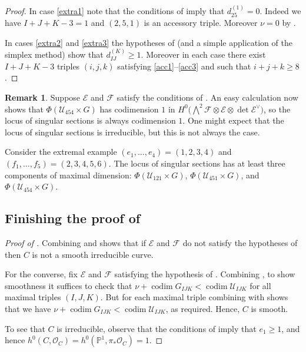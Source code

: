 \documentclass[11pt]{amsart}
\numberwithin{theorem}{section}
\numberwithin{equation}{section}
\theoremstyle{definition}\newtheorem{defn}[theorem]{Definition}
\theoremstyle{definition}\newtheorem{remark}[theorem]{Remark}
\theoremstyle{definition}\newtheorem{question}[theorem]{Question}
\theoremstyle{definition}\newtheorem{problem}[theorem]{Problem}
\newcommand{\PP}{\mathbb{P}}
\newcommand{\cE}{\mathcal{E}}
\newcommand{\cF}{\mathcal{F}}
\newcommand{\cO}{\mathcal{O}}
\DeclareMathOperator{\codim}{codim}
\newcommand{\marksing}{\mathcal{U}}
\newcommand{\I}{I}
\newcommand{\J}{J}
\newcommand{\K}{K}
\begin{document}
\begin{proof}
In case \ref{extra1} note that the conditions of  imply that $d^{(1)}_{25} = 0$. Indeed we have $\I+\J+\K-3 = 1$ and $(2,5,1)$ is an accessory triple. Moreover $\nu = 0$ by .

In cases \ref{extra2} and \ref{extra3} the hypotheses of  (and a simple application of the simplex method) show that $d^{(\K)}_{\I \J} \geq 1$. Moreover in each case there exist $\I+\J+\K-3$ triples $(i,j,k)$ satisfying \ref{acc1}--\ref{acc3} and such that $i + j + k \geq 8$. 
\end{proof}

\begin{remark}
Suppose $\cE$ and $\cF$ satisfy the conditions of . An easy calculation now shows that $\Phi(\marksing_{454} \times G)$ has codimension $1$ in $H^0\Big(\bigwedge\nolimits^2 \cF \otimes \cE \otimes \det \cE^\vee \Big)$, so the locus of singular sections is always codimension $1$. One might expect that the locus of singular sections is irreducible, but this is not always the case.

Consider the extremal example $(e_1,\dots,e_4) = (1,2,3,4)$ and $(f_1,\dots,f_5) = (2,3,4,5,6)$. The locus of singular sections has at least three components of maximal dimension: $\Phi(\marksing_{121} \times G)$, $\Phi(\marksing_{451} \times G)$, and $\Phi(\marksing_{454} \times G)$.
\end{remark}

\subsection{Finishing the proof of }

\begin{proof}[Proof of ]
Combining \cite[Section~5]{CL} and  shows that if $\cE$ and $\cF$ do not satisfy the hypotheses of  then $C$ is not a smooth irreducible curve.

For the converse, fix $\cE$ and $\cF$ satisfying the hypothesis of . Combining , to show smoothness it suffices to check that $\nu + \codim G_{\I\J\K} < \codim \marksing_{\I\J\K}$ for all maximal triples $(\I,\J,\K)$. 
But for each maximal triple combining  with  shows that we have $\nu + \codim G_{\I\J\K} < \codim \marksing_{\I\J\K}$, as required. Hence, $C$ is smooth. 

To see that $C$ is irreducible, observe that the conditions of  imply that $e_1 \geq 1$, and hence $h^0(C,\cO_C) = h^0(\PP^1,\pi_* \cO_C) = 1$.
\end{proof}
\end{document}
